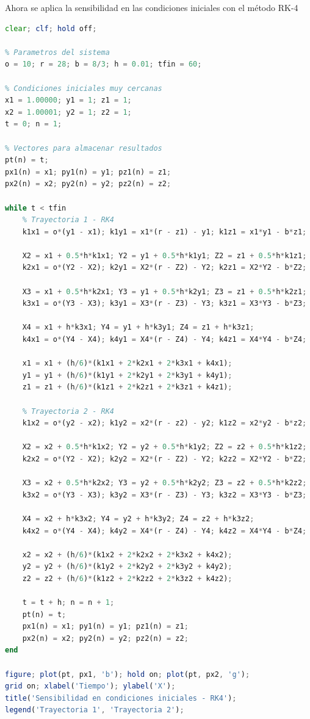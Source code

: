 \documentclass[a4paper,12pt]{article}
\theoremstyle{mytheor}
\begin{document}
Ahora se aplica la sensibilidad en las condiciones iniciales con el método RK-4

\begin{lstlisting}[language=Octave, breaklines=true]
clear; clf; hold off;

% Parametros del sistema
o = 10; r = 28; b = 8/3; h = 0.01; tfin = 60;

% Condiciones iniciales muy cercanas
x1 = 1.00000; y1 = 1; z1 = 1;
x2 = 1.00001; y2 = 1; z2 = 1;
t = 0; n = 1;

% Vectores para almacenar resultados
pt(n) = t;
px1(n) = x1; py1(n) = y1; pz1(n) = z1;
px2(n) = x2; py2(n) = y2; pz2(n) = z2;

while t < tfin
    % Trayectoria 1 - RK4
    k1x1 = o*(y1 - x1); k1y1 = x1*(r - z1) - y1; k1z1 = x1*y1 - b*z1;
    
    X2 = x1 + 0.5*h*k1x1; Y2 = y1 + 0.5*h*k1y1; Z2 = z1 + 0.5*h*k1z1;
    k2x1 = o*(Y2 - X2); k2y1 = X2*(r - Z2) - Y2; k2z1 = X2*Y2 - b*Z2;
    
    X3 = x1 + 0.5*h*k2x1; Y3 = y1 + 0.5*h*k2y1; Z3 = z1 + 0.5*h*k2z1;
    k3x1 = o*(Y3 - X3); k3y1 = X3*(r - Z3) - Y3; k3z1 = X3*Y3 - b*Z3;
    
    X4 = x1 + h*k3x1; Y4 = y1 + h*k3y1; Z4 = z1 + h*k3z1;
    k4x1 = o*(Y4 - X4); k4y1 = X4*(r - Z4) - Y4; k4z1 = X4*Y4 - b*Z4;
    
    x1 = x1 + (h/6)*(k1x1 + 2*k2x1 + 2*k3x1 + k4x1);
    y1 = y1 + (h/6)*(k1y1 + 2*k2y1 + 2*k3y1 + k4y1);
    z1 = z1 + (h/6)*(k1z1 + 2*k2z1 + 2*k3z1 + k4z1);
    
    % Trayectoria 2 - RK4
    k1x2 = o*(y2 - x2); k1y2 = x2*(r - z2) - y2; k1z2 = x2*y2 - b*z2;
    
    X2 = x2 + 0.5*h*k1x2; Y2 = y2 + 0.5*h*k1y2; Z2 = z2 + 0.5*h*k1z2;
    k2x2 = o*(Y2 - X2); k2y2 = X2*(r - Z2) - Y2; k2z2 = X2*Y2 - b*Z2;
    
    X3 = x2 + 0.5*h*k2x2; Y3 = y2 + 0.5*h*k2y2; Z3 = z2 + 0.5*h*k2z2;
    k3x2 = o*(Y3 - X3); k3y2 = X3*(r - Z3) - Y3; k3z2 = X3*Y3 - b*Z3;
    
    X4 = x2 + h*k3x2; Y4 = y2 + h*k3y2; Z4 = z2 + h*k3z2;
    k4x2 = o*(Y4 - X4); k4y2 = X4*(r - Z4) - Y4; k4z2 = X4*Y4 - b*Z4;
    
    x2 = x2 + (h/6)*(k1x2 + 2*k2x2 + 2*k3x2 + k4x2);
    y2 = y2 + (h/6)*(k1y2 + 2*k2y2 + 2*k3y2 + k4y2);
    z2 = z2 + (h/6)*(k1z2 + 2*k2z2 + 2*k3z2 + k4z2);
    
    t = t + h; n = n + 1;
    pt(n) = t;
    px1(n) = x1; py1(n) = y1; pz1(n) = z1;
    px2(n) = x2; py2(n) = y2; pz2(n) = z2;
end

figure; plot(pt, px1, 'b'); hold on; plot(pt, px2, 'g');
grid on; xlabel('Tiempo'); ylabel('X');
title('Sensibilidad en condiciones iniciales - RK4');
legend('Trayectoria 1', 'Trayectoria 2');
\end{lstlisting}
\end{document}
